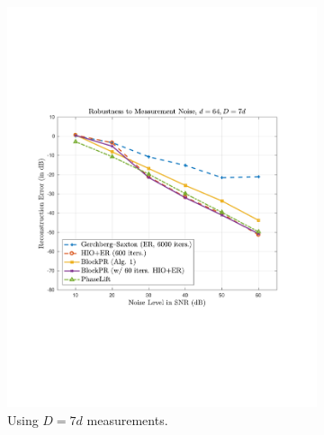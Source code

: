 \begin{figure}[hbtp]
\centering
\begin{subfigure}[b]{0.510\textwidth}
\centering
\includegraphics[clip=true, trim = 0.75in 2.75in 1in 2.5in,scale=0.45]{pics/robustness_600a}
\caption{Using $D=7d$ measurements.}
\label{fig:noise-7d}
\end{subfigure}
\hfill
\begin{subfigure}[b]{0.480\textwidth}
\centering

\end{subfigure}
\end{figure}

